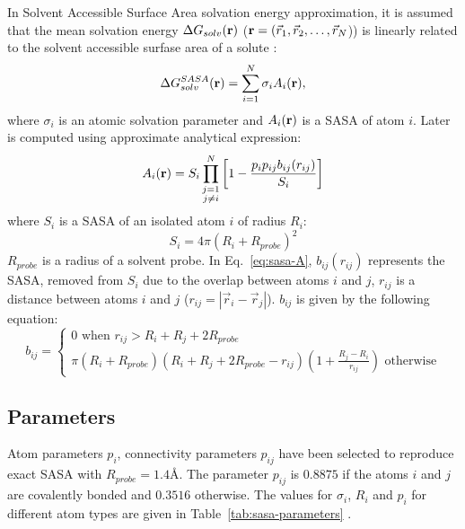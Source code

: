 \documentclass[11pt]{book}
\begin{document}
In Solvent Accessible Surface Area solvation energy approximation, it is assumed that the mean solvation energy $\Delta G_{solv}({\bf r})$ (${\bf r}=(\vec{r}_{1},\vec{r}_{2},\ldots,\vec{r}_{N}$)) is linearly related to the solvent accessible surfase area of a solute \cite{EisenbergNature86,FraternaliJMB96,FerraraProteins02}:
\begin{equation}\label{eq:sasa-V}
\Delta G_{solv}^{SASA}({\bf r})=\sum_{i=1}^{N}\sigma_{i}A_{i}({\bf r}),
\end{equation}
where $\sigma_{i}$ is an atomic solvation parameter and $A_{i}({\bf r})$ is a SASA of atom $i$. Later is computed using approximate analytical expression:
\begin{equation}\label{eq:sasa-A}
A_{i}({\bf r})=S_{i}\prod_{\substack{j=1\\j\ne i}}^{N}\left[1-\frac{p_{i}p_{ij}b_{ij}(r_{ij})}{S_{i}}\right]
\end{equation}
where $S_{i}$ is a SASA of an isolated atom $i$ of radius $R_{i}$:
\begin{equation}\label{eq:sasa-S}
S_{i}=4\pi\left(R_{i}+R_{probe}\right)^{2}
\end{equation}
$R_{probe}$ is a radius of a solvent probe. In Eq.~\ref{eq:sasa-A}, $b_{ij}(r_{ij})$ represents the SASA, removed from $S_i$ due to the overlap between atoms $i$ and $j$, $r_{ij}$ is a distance between atoms $i$ and $j$ ($r_{ij}=|\vec{r}_{i}-\vec{r}_{j}|$). $b_{ij}$ is given by the following equation:
\begin{equation}\label{eq:sasa-bij}
b_{ij}=
\begin{cases}
	0 \text{ when }r_{ij}>R_{i}+R_{j}+2R_{probe} \\
	\pi\left(R_{i}+R_{probe}\right)\left(R_{i}+R_{j}+2R_{probe}-r_{ij}\right)\left(1+\frac{R_{j}-R_{i}}{r_{ij}}\right) \text{ otherwise}
\end{cases}
\end{equation}
\subsection{Parameters}
Atom parameters $p_{i}$, connectivity parameters $p_{ij}$ have been selected to reproduce exact SASA with $R_{probe}=1.4$\AA. The parameter $p_{ij}$ is $0.8875$ if the atoms $i$ and $j$ are covalently bonded and $0.3516$ otherwise. The values for $\sigma_{i}$, $R_{i}$ and $p_{i}$ for different atom types are given in Table~\ref{tab:sasa-parameters} \cite{FerraraProteins02}.
\end{document}

